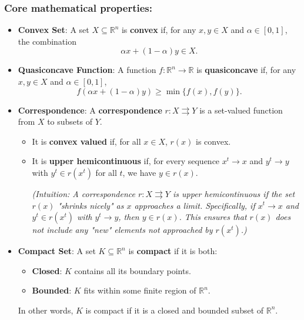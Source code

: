 \documentclass{article}
\begin{document}
\subsubsection{Core mathematical properties:}

\begin{itemize}

    \item \textbf{Convex Set}:
    A set \( X \subseteq \mathbb{R}^n \) is \textbf{convex} if, for any \( x, y \in X \) and \( \alpha \in [0, 1] \), the combination
    \[
    \alpha x + (1 - \alpha) y \in X.
    \]

    \item \textbf{Quasiconcave Function}:
    A function \( f : \mathbb{R}^n \to \mathbb{R} \) is \textbf{quasiconcave} if, for any \( x, y \in X \) and \( \alpha \in [0, 1] \),
    \[
    f(\alpha x + (1 - \alpha) y) \geq \min\{f(x), f(y)\}.
    \]

    \item \textbf{Correspondence}:
    A \textbf{correspondence} \( r : X \rightrightarrows Y \) is a set-valued function from \( X \) to subsets of \( Y \).
    \begin{itemize}
        \item It is \textbf{convex valued} if, for all \( x \in X \), \( r(x) \) is convex.
        \item It is \textbf{upper hemicontinuous} if, for every sequence \( x^t \to x \) and \( y^t \to y \) with \( y^t \in r(x^t) \) for all \( t \), we have \( y \in r(x) \).
        
        \textit{(Intuition: A correspondence \( r : X \rightrightarrows Y \) is upper hemicontinuous if the set \( r(x) \) "shrinks nicely" as \( x \) approaches a limit. Specifically, if \( x^t \to x \) and \( y^t \in r(x^t) \) with \( y^t \to y \), then \( y \in r(x) \). This ensures that \( r(x) \) does not include any "new" elements not approached by \( r(x^t) \).)}
    \end{itemize}

    \item \textbf{Compact Set}:
    A set \( K \subseteq \mathbb{R}^n \) is \textbf{compact} if it is both:
    \begin{itemize}
        \item \textbf{Closed}: \( K \) contains all its boundary points.
        \item \textbf{Bounded}: \( K \) fits within some finite region of \( \mathbb{R}^n \).
    \end{itemize}
    In other words, \( K \) is compact if it is a closed and bounded subset of \( \mathbb{R}^n \).


\end{itemize}
\end{document}
